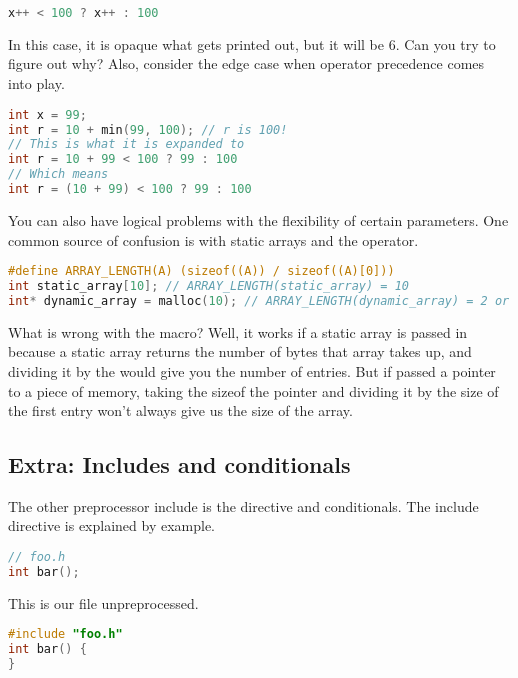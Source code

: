 \begin{lstlisting}[language=C]
  x++ < 100 ? x++ : 100
\end{lstlisting}

In this case, it is opaque what gets printed out, but it will be 6.
Can you try to figure out why?
Also, consider the edge case when \gls{operator precedence} comes into play.

\begin{lstlisting}[language=C]
int x = 99;
int r = 10 + min(99, 100); // r is 100!
// This is what it is expanded to
int r = 10 + 99 < 100 ? 99 : 100
// Which means
int r = (10 + 99) < 100 ? 99 : 100
\end{lstlisting}

You can also have logical problems with the flexibility of certain parameters.
One common source of confusion is with static arrays and the  operator.

\begin{lstlisting}[language=C]
#define ARRAY_LENGTH(A) (sizeof((A)) / sizeof((A)[0]))
int static_array[10]; // ARRAY_LENGTH(static_array) = 10
int* dynamic_array = malloc(10); // ARRAY_LENGTH(dynamic_array) = 2 or 1 consistently
\end{lstlisting}

What is wrong with the macro?
Well, it works if a \gls{static array} is passed in because  a static array returns the number of bytes that array takes up, and dividing it by the  would give you the number of entries.
But if passed a pointer to a piece of memory, taking the sizeof the pointer and dividing it by the size of the first entry won't always give us the size of the array.

\subsection{Extra: Includes and conditionals}

The other preprocessor include is the  directive and conditionals.
The include directive is explained by example.

\begin{lstlisting}[language=C]
// foo.h
int bar();
\end{lstlisting}

This is our file  unpreprocessed.

\begin{lstlisting}[language=C]
#include "foo.h"
int bar() {
}
\end{lstlisting}

